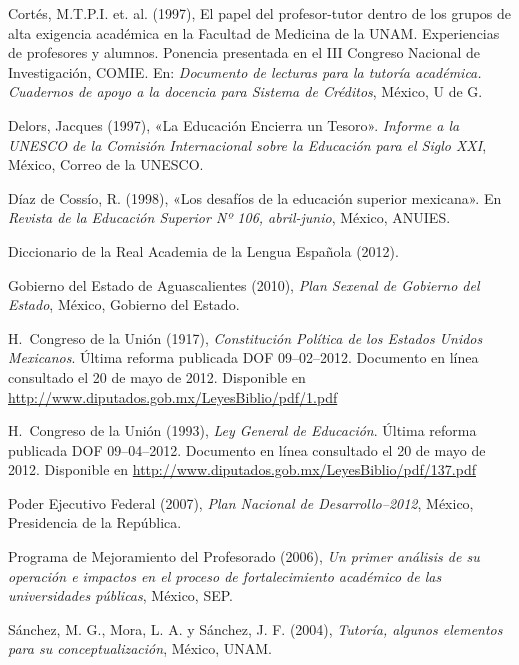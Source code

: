 Cortés, M.T.P.I. et. al. (1997), El papel del profesor-tutor dentro de los
grupos de alta exigencia académica en la Facultad de Medicina de la UNAM.
Experiencias de profesores y alumnos. Ponencia presentada en el III
Congreso Nacional de Investigación, COMIE. En: \textit{Documento de
lecturas para la tutoría académica. Cuadernos de apoyo a la
docencia para Sistema de Créditos}, México, U de G.

Delors, Jacques (1997), «La Educación Encierra un Tesoro». \textit{Informe a
la UNESCO de la Comisión Internacional sobre la Educación para el Siglo
XXI}, México, Correo de la UNESCO.

Díaz de Cossío, R. (1998), «Los desafíos de la educación superior mexicana».
En \textit{Revista de la Educación Superior Nº 106, abril-junio}, México,
ANUIES.

Diccionario de la Real Academia de la Lengua Española (2012).

Gobierno del Estado de Aguascalientes (2010), \textit{Plan Sexenal de
Gobierno del Estado}, México, Gobierno del Estado.

\begin{sloppypar}
H.\ Congreso de la Unión (1917), \textit{Constitución Política de los Estados
Unidos Mexicanos}. Última reforma publicada DOF 09--02--2012. Documento en
línea consultado el 20 de mayo de 2012. Disponible en
\url{http://www.diputados.gob.mx/LeyesBiblio/pdf/1.pdf}
\end{sloppypar}

\begin{sloppypar}
H.\ Congreso de la Unión (1993), \textit{Ley General de Educación}. Última
reforma publicada DOF 09--04--2012. Documento en línea consultado el 20 de
mayo de 2012. Disponible en
\url{http://www.diputados.gob.mx/LeyesBiblio/pdf/137.pdf}
\end{sloppypar}

\begin{sloppypar}
Poder Ejecutivo Federal (2007), \textit{Plan Nacional de Desarrollo--2012}, México, Presidencia de la República.
\end{sloppypar}
\newpage

Programa de Mejoramiento del Profesorado (2006), \textit{Un primer análisis
de su operación e impactos en el proceso de fortalecimiento académico de
las universidades públicas}, México, SEP.

Sánchez, M. G., Mora, L. A. y Sánchez, J. F. (2004), \textit{Tutoría, algunos
elementos para su conceptualización}, México, UNAM.

